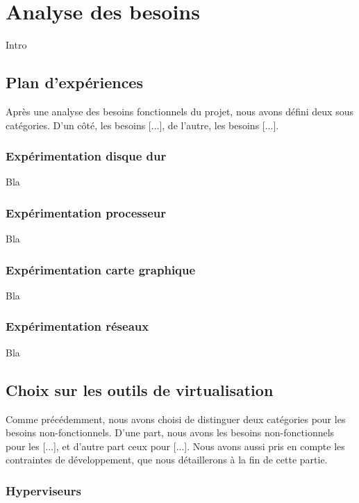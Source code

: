 \chapter{Analyse des besoins}

Intro

\section{Plan d'expériences}

Après une analyse des besoins fonctionnels du projet, nous avons défini deux sous catégories. D'un côté, les besoins [...], de l'autre, les besoins [...].

\subsection{Expérimentation disque dur}

Bla

\subsection{Expérimentation processeur}

Bla

\subsection{Expérimentation carte graphique}

Bla
\subsection{Expérimentation réseaux}

Bla
\newpage

\section{Choix sur les outils de virtualisation}

Comme précédemment, nous avons choisi de distinguer deux catégories pour les besoins non-fonctionnels. D'une part, nous avons les besoins non-fonctionnels pour les [...], et d'autre part ceux pour [...]. Nous avons aussi pris en compte les contraintes de développement, que nous détaillerons à la fin de cette partie.

\subsection{Hyperviseurs}

